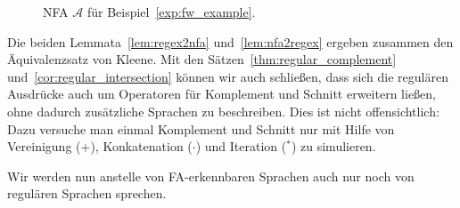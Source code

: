 \documentclass[11pt, a4paper]{article}
\theoremstyle{definition}
\theoremstyle{plain}
\numberwithin{equation}{section}
\begin{document}
\begin{figure}
	\centering
	
	\caption{NFA $\mathcal{A}$ für Beispiel~\ref{exp:fw_example}.}
	\label{fig:fw_example}
\end{figure}
Die beiden Lemmata~\ref{lem:regex2nfa} und~\ref{lem:nfa2regex} ergeben zusammen den Äquivalenzsatz von Kleene. Mit den Sätzen~\ref{thm:regular_complement} und~\ref{cor:regular_intersection} können wir auch schließen, dass sich die regulären Ausdrücke auch um Operatoren für Komplement und Schnitt erweitern ließen, ohne dadurch zusätzliche Sprachen zu beschreiben. Dies ist nicht offensichtlich: Dazu versuche man einmal Komplement und Schnitt nur mit Hilfe von Vereinigung ($+$), Konkatenation ($\cdot$) und Iteration ($^\ast$) zu simulieren.\par
Wir werden nun anstelle von FA-erkennbaren Sprachen auch nur noch von regulären Sprachen sprechen.
\end{document}
